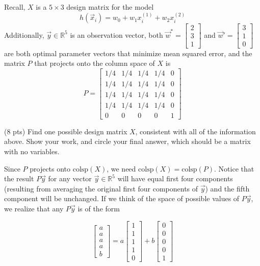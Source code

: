 \documentclass[11pt]{article}
\begin{document}
\begin{prob}[(19 pts)]
Recall, $X$ is a $5 \times 3$ design matrix for the model
$$h(\vec x_i) = w_0 + w_1 x_i^{(1)} + w_2 x_i^{(2)}$$
Additionally, $\vec y \in \mathbb{R}^5$ is an observation vector, both $\vec w^* = \begin{bmatrix} 2 \\ 3 \\ 1 \end{bmatrix}$ and $\vec w' = \begin{bmatrix} 3 \\ 1 \\ 0 \end{bmatrix}$ are both optimal parameter vectors that minimize mean squared error, and the matrix $P$ that projects onto the column space of $X$ is
$$P = \begin{bmatrix} 1/4 & 1/4 & 1/4 & 1/4 & 0 \\ 1/4 & 1/4 & 1/4 & 1/4 & 0 \\ 1/4 & 1/4 & 1/4 & 1/4 & 0 \\ 1/4 & 1/4 & 1/4 & 1/4 & 0 \\ 0 & 0 & 0 & 0 & 1 \end{bmatrix}$$

\begin{subprob}(8 pts)
Find one possible design matrix $X$, consistent with all of the information above. Show your work, and $\boxed{\text{circle}}$ your final answer, which should be a matrix with no variables. \\

\emptybox{13cm}

\begin{solution}
Since $P$ projects onto $\text{colsp}(X)$, we need $\text{colsp}(X) = \text{colsp}(P)$. Notice that the result $P \vec y$ for any vector $\vec y \in \mathbb{R}^5$ will have equal first four components (resulting from averaging the original first four components of $\vec y$) and the fifth component will be unchanged. If we think of the space of possible values of $P \vec y$, we realize that any $P \vec y$ is of the form

$$\begin{bmatrix} a \\ a \\ a \\ a \\ b \end{bmatrix} = a \begin{bmatrix} 1 \\ 1 \\ 1 \\ 1 \\ 0 \end{bmatrix} + b \begin{bmatrix} 0 \\ 0 \\ 0 \\ 0 \\ 1 \end{bmatrix}$$


\end{solution}
\end{subprob}
\end{prob}
\end{document}

